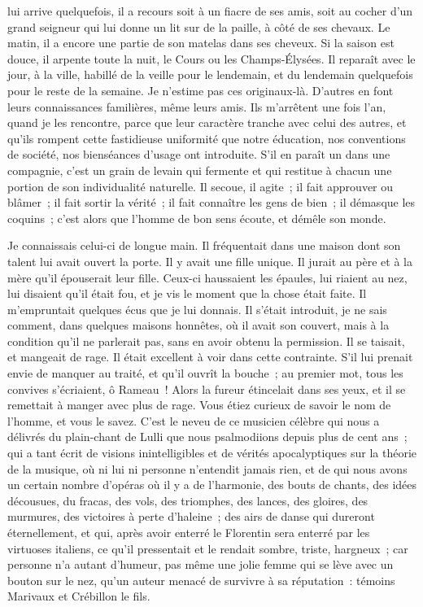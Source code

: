 \documentclass[french,twoside]{book} %
\begin{document}
lui arrive quelquefois, il a recours soit à un fiacre de ses amis, soit au cocher d’un grand seigneur qui lui donne un lit sur de la paille, à côté de ses chevaux. Le matin, il a encore une partie de son matelas dans ses cheveux. Si la saison est douce, il arpente toute la nuit, le Cours ou les Champs-Élysées. Il reparaît avec le jour, à la ville, habillé de la veille pour le lendemain, et du lendemain quelquefois pour le reste de la semaine. Je n’estime pas ces originaux-là. D’autres en font leurs connaissances familières, même leurs amis. Ils m’arrêtent une fois l’an, quand je les rencontre, parce que leur caractère tranche avec celui des autres, et qu’ils rompent cette fastidieuse uniformité que notre éducation, nos conventions de société, nos bienséances d’usage ont introduite. S’il en paraît un dans une compagnie, c’est un grain de levain qui fermente et qui restitue à chacun une portion de son individualité naturelle. Il secoue, il agite ; il fait approuver ou blâmer ; il fait sortir la vérité ; il fait connaître les gens de bien ; il démasque les coquins ; c’est alors que l’homme de bon sens écoute, et démêle son monde.\par
Je connaissais celui-ci de longue main. Il fréquentait dans une maison dont son talent lui avait ouvert la porte. Il y avait une fille unique. Il jurait au père et à la mère qu’il épouserait leur fille. Ceux-ci haussaient les épaules, lui riaient au nez, lui disaient qu’il était fou, et je vis le moment que la chose était faite. Il m’empruntait quelques écus que je lui donnais. Il s’était introduit, je ne sais comment, dans quelques maisons honnêtes, où il avait son couvert, mais à la condition qu’il ne parlerait pas, sans en avoir obtenu la permission. Il se taisait, et mangeait de rage. Il était excellent à voir dans cette contrainte. S’il lui prenait envie de manquer au traité, et qu’il ouvrît la bouche ; au premier mot, tous les convives s’écriaient, ô Rameau ! Alors la fureur étincelait dans ses yeux, et il se remettait à manger avec plus de rage. Vous étiez curieux de savoir le nom de l’homme, et vous le savez. C’est le neveu de ce musicien célèbre qui nous a délivrés du plain-chant de Lulli que nous psalmodiions depuis plus de cent ans ; qui a tant écrit de visions inintelligibles et de vérités apocalyptiques sur la théorie de la musique, où ni lui ni personne n’entendit jamais rien, et de qui nous avons un certain nombre d’opéras où il y a de l’harmonie, des bouts de chants, des idées décousues, du fracas, des vols, des triomphes, des lances, des gloires, des murmures, des victoires à perte d’haleine ; des airs de danse qui dureront éternellement, et qui, après avoir enterré le Florentin sera enterré par les virtuoses italiens, ce qu’il pressentait et le rendait sombre, triste, hargneux ; car personne n’a autant d’humeur, pas même une jolie femme qui se lève avec un bouton sur le nez, qu’un auteur menacé de survivre à sa réputation : témoins Marivaux et Crébillon le fils.\par
\end{document}
